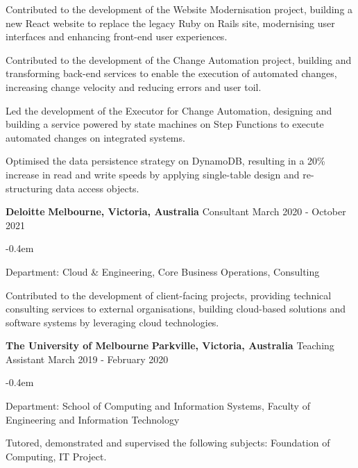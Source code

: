 \documentclass{cv}
\begin{document}
\begin{list}{}{\setlength{\leftmargin}{0em}}
\begin{list}{\raisebox{0.2em}{\tiny$\bullet$}}{\leftmargin=1.0em}
        \item Contributed to the development of the Website Modernisation project, building a new React website to replace the legacy Ruby on Rails site, modernising user interfaces and enhancing front-end user experiences.
        \item Contributed to the development of the Change Automation project, building and transforming back-end services to enable the execution of automated changes, increasing change velocity and reducing errors and user toil.
        \item Led the development of the Executor for Change Automation, designing and building a service powered by state machines on Step Functions to execute automated changes on integrated systems.
        \item Optimised the data persistence strategy on DynamoDB, resulting in a 20\% increase in read and write speeds by applying single-table design and re-structuring data access objects.
    \end{list}
\item[]
    \textbf{Deloitte} \hfill \textbf{Melbourne, Victoria, Australia}%
    \vspace{0.1em} \newline 
    {Consultant} \hfill {March 2020 - October 2021}%
    \begin{list}{\raisebox{0.2em}{\tiny$\bullet$}}{\leftmargin=1.0em}
    \itemsep -0.4em \vspace{-0.4em}
        \item Department: Cloud \& Engineering, Core Business Operations, Consulting
        \item Contributed to the development of client-facing projects, providing technical consulting services to external organisations, building cloud-based solutions and software systems by leveraging cloud technologies.
    \end{list}
\item[]
    \textbf{The University of Melbourne} \hfill \textbf{Parkville, Victoria, Australia}%
    \vspace{0.1em} \newline 
    {Teaching Assistant} \hfill {March 2019 - February 2020}%
    \begin{list}{\raisebox{0.2em}{\tiny$\bullet$}}{\leftmargin=1.0em}
    \itemsep -0.4em \vspace{-0.4em}
        \item Department: School of Computing and Information Systems, Faculty of Engineering and Information Technology
        \item Tutored, demonstrated and supervised the following subjects: Foundation of Computing, IT Project.
    \end{list}
\end{list}
\end{document}
